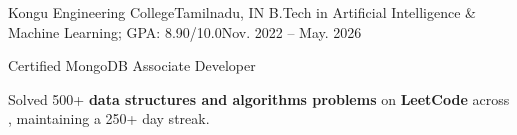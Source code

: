\documentclass[11pt,a4paper]{article}
\begin{document}
\listStart
\begin{body}
\itemWithTitleAndSubHeading
{Kongu Engineering College}{Tamilnadu, IN}
{B.Tech in Artificial Intelligence \& Machine Learning; GPA: 8.90/10.0}{Nov. 2022 -- May. 2026}
\end{body}
\listEnd

\listStart
\begin{body}
\item Certified MongoDB Associate Developer {}
\item Solved 500+ {\textbf{data structures and algorithms problems}} on {\textbf{LeetCode}} across {}, maintaining a 250+ day streak.
\end{body}
\listEnd
\end{document}
